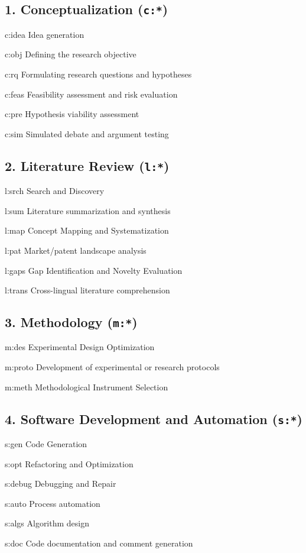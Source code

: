 \documentclass[11pt]{article}
\begin{document}
\subsection*{1. Conceptualization (\texttt{c:*})}
\begin{gaikeys}
    \item[c:idea] Idea generation
    \item[c:obj]  Defining the research objective
    \item[c:rq]   Formulating research questions and hypotheses
    \item[c:feas] Feasibility assessment and risk evaluation
    \item[c:pre]  Hypothesis viability assessment
    \item[c:sim]  Simulated debate and argument testing
\end{gaikeys}

\subsection*{2. Literature Review (\texttt{l:*})}
\begin{gaikeys}
    \item[l:srch]  Search and Discovery
    \item[l:sum]   Literature summarization and synthesis
    \item[l:map]   Concept Mapping and Systematization
    \item[l:pat]   Market/patent landscape analysis
    \item[l:gaps]  Gap Identification and Novelty Evaluation
    \item[l:trans] Cross-lingual literature comprehension
\end{gaikeys}

\subsection*{3. Methodology (\texttt{m:*})}
\begin{gaikeys}
    \item[m:des]   Experimental Design Optimization
    \item[m:proto] Development of experimental or research protocols
    \item[m:meth]  Methodological Instrument Selection
\end{gaikeys}

\subsection*{4. Software Development and Automation (\texttt{s:*})}
\begin{gaikeys}
    \item[s:gen]   Code Generation
    \item[s:opt]   Refactoring and Optimization
    \item[s:debug] Debugging and Repair
    \item[s:auto]  Process automation
    \item[s:algs]  Algorithm design
    \item[s:doc]   Code documentation and comment generation
\end{gaikeys}
\end{document}
